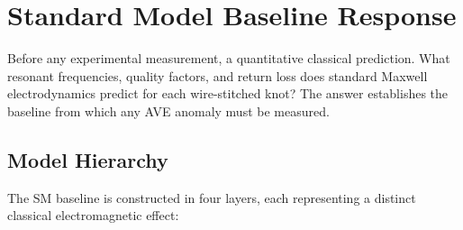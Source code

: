\section{Standard Model Baseline Response}

Before any experimental measurement, a quantitative classical prediction. What resonant frequencies, quality factors, and return loss does standard Maxwell electrodynamics predict for each wire-stitched knot? The answer establishes the baseline from which any AVE anomaly must be measured.

\subsection{Model Hierarchy}

The SM baseline is constructed in four layers, each representing a distinct classical electromagnetic effect:

